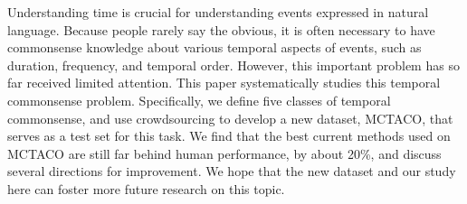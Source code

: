 Understanding time is crucial for understanding events expressed in natural language. Because people rarely say the obvious, it is often necessary to have commonsense knowledge about various temporal aspects of events, such as duration, frequency, and temporal order. However, this important problem has so far received limited attention. This paper systematically studies this temporal commonsense problem. Specifically, we define five classes of temporal commonsense, and use crowdsourcing to develop a new dataset, MCTACO, that serves as a test set for this task. We find that the best current methods used on MCTACO are still far behind human performance, by about 20\%, and discuss several directions for improvement. We hope that the new dataset and our study here can foster more future research on this topic.